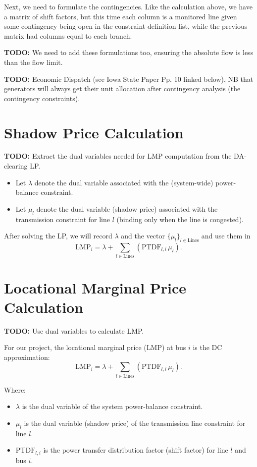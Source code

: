 \documentclass[11pt]{article}
\begin{document}
Next, we need to formulate the contingencies. Like the calculation above, we have a matrix of shift factors, but this time each column is a monitored line given some contingency being open in the constraint definition list, while the previous matrix had columns equal to each branch.

\textbf{TODO:} We need to add these formulations too, ensuring the absolute flow is less than the flow limit.

\textbf{TODO:} Economic Dispatch (see Iowa State Paper Pp. 10 linked below), NB that generators will always get their unit allocation after contingency analysis (the contingency constraints).

\section{Shadow Price Calculation}
\textbf{TODO:} Extract the dual variables needed for LMP computation from the DA-clearing LP.
\begin{itemize}
  \item Let $\lambda$ denote the dual variable associated with the (system-wide) power-balance constraint.
  \item Let $\mu_l$ denote the dual variable (shadow price) associated with the transmission constraint for line $l$ (binding only when the line is congested).
\end{itemize}
After solving the LP, we will record $\lambda$ and the vector $\{\mu_l\}_{l\in\text{Lines}}$ and use them in
\[
  \mathrm{LMP}_i = \lambda + \sum_{l\in\text{Lines}} \left(\mathrm{PTDF}_{l,i}\,\mu_l\right).
\]

\newpage
\section{Locational Marginal Price Calculation}
\textbf{TODO:} Use dual variables to calculate LMP.

For our project, the locational marginal price (LMP) at bus $i$ is the DC approximation:
\[
  \mathrm{LMP}_i = \lambda + \sum_{l\in\text{Lines}} \left(\mathrm{PTDF}_{l,i}\,\mu_l\right).
\]

\noindent
Where:
\begin{itemize}
  \item $\lambda$ is the dual variable of the system power-balance constraint.
  \item $\mu_l$ is the dual variable (shadow price) of the transmission line constraint for line $l$.
  \item $\mathrm{PTDF}_{l,i}$ is the power transfer distribution factor (shift factor) for line $l$ and bus $i$.
\end{itemize}
\end{document}
